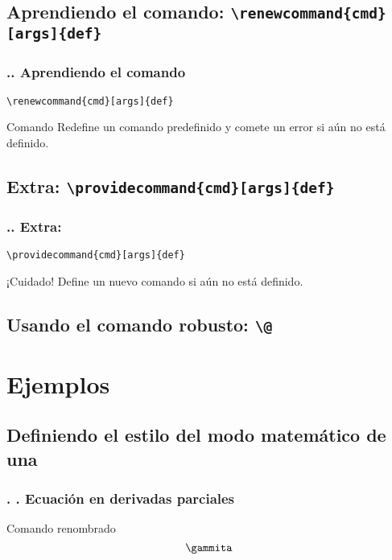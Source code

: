 \documentclass[12pt]{beamer}
\begin{document}
\cprotect\subsection{Aprendiendo el comando: \verb!\renewcommand{cmd}[args]{def}!}

\begin{frame}[fragile]
\frametitle{\thesection.\thesubsection. Aprendiendo el comando }
\vspace*{-2cm}
\centering
\verb|\renewcommand{cmd}[args]{def}|

\begin{block}{Comando }
Redefine un comando predefinido y comete un error si aún no está definido.
\end{block}
\end{frame}

\cprotect\subsection{Extra: \verb!\providecommand{cmd}[args]{def}!}

\begin{frame}[fragile]
\frametitle{\thesection.\thesubsection. Extra: }
\vspace*{-2cm}
\centering
\verb|\providecommand{cmd}[args]{def}|
\begin{alertblock}{¡Cuidado!}
Define un nuevo comando si aún no está definido.
\end{alertblock}
\end{frame}

\cprotect\subsection{Usando el comando robusto: \verb!\@!}

\section{Ejemplos}

\subsection{Definiendo el estilo del modo matemático de una }

\begin{frame}
\frametitle{\thesection. \thesubsection. Ecuación en derivadas parciales}
Comando renombrado 
\[\gammita\]
\end{frame}
\end{document}
